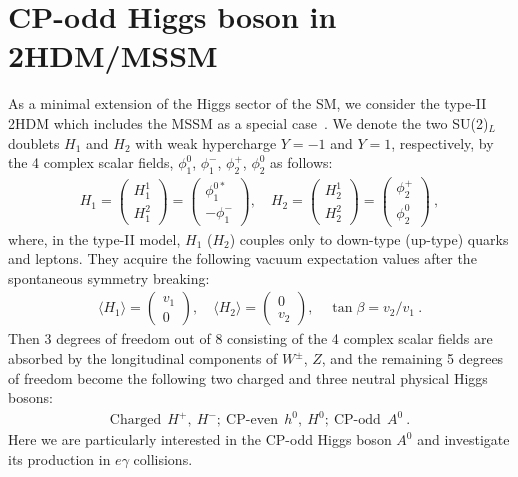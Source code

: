 \documentclass[final,5p,times,twocolumn]{elsarticle}
\begin{document}
\section{CP-odd Higgs boson in 2HDM/MSSM}\label{Section2}
As a minimal extension of the Higgs sector of the SM, we consider the type-II 2HDM which includes the MSSM as a special case~\cite{Hunter}.  
We denote the two SU(2)$_L$ doublets $H_1$ and $H_2$ with weak hypercharge
$Y=-1$ and $Y=1$, respectively, by the 
4 complex scalar fields, $\phi_1^0$, $\phi_1^-$, $\phi_2^+$, $\phi_2^0$
as follows:
\begin{eqnarray}
H_1=\left(
\begin{array}{c}
H_1^1\\
H_1^2
\end{array}
\right)=\left(
\begin{array}{c}
\phi_1^{0*}\\
-\phi_1^-
\end{array}
\right),
\quad
H_2=\left(
\begin{array}{c}
H_2^1\\
H_2^2
\end{array}
\right)=\left(
\begin{array}{c}
\phi_2^+\\
\phi_2^0
\end{array}
\right)~,
\end{eqnarray}
where, in the type-II model, $H_1$ ($H_2$)
couples only  to  down-type (up-type) quarks and leptons.
They acquire the following vacuum expectation values after the
spontaneous symmetry breaking:
\begin{eqnarray}
\langle H_1\rangle=\left(
\begin{array}{c}
v_1\\
0
\end{array}
\right),
\quad
\langle H_2\rangle=\left(
\begin{array}{c}
0\\
v_2
\end{array}
\right),\quad
\tan\beta=v_2/v_1~.
\end{eqnarray}
Then 3 degrees of freedom out of 8 consisting of the 4 complex scalar fields
are absorbed by the longitudinal components of $W^\pm$, $Z$,  
and the remaining 5 degrees of freedom become the following two charged and 
three neutral physical Higgs bosons:
\begin{eqnarray}
\mbox{Charged}\ \ H^+,\ H^-;\ \mbox{CP-even}\ \ h^0,\ H^0;\ \mbox{CP-odd}\ \ A^0~.
\end{eqnarray}
Here we are particularly interested in the CP-odd Higgs boson $A^0$ and 
investigate its production in $e\gamma$ collisions.
\end{document}
